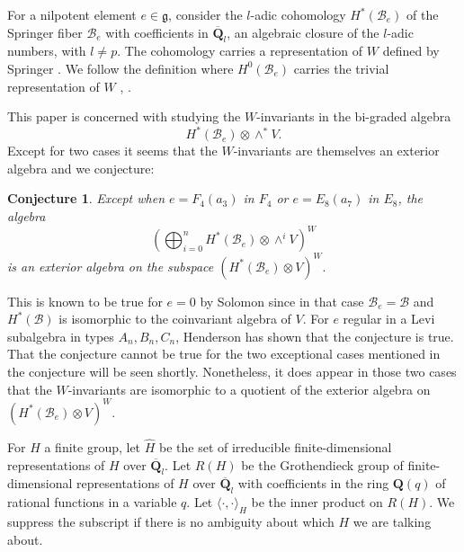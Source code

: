 \documentclass[10pt]{amsart}
\newcommand{\g}{\mathfrak{g}}
\newcommand{\zz}{\mathbf Z}
\newcommand{\qq}{\mathbf Q}
\newcommand{\flag}{{\mathcal B}}
\theoremstyle{plain}
\newtheorem{conjecture}[theorem]{Conjecture}
\theoremstyle{definition}
\theoremstyle{remark}
\begin{document}
For a nilpotent element $e \in \g$, consider the $l$-adic cohomology $H^*(\flag_e)$ of the Springer fiber $\flag_e$ with coefficients in $\overline{\qq}_l$, 
an algebraic closure of the $l$-adic numbers, with $l \neq p$.
The cohomology carries a representation of $W$ defined by Springer \cite{springer:green}.  We follow the definition where $H^0(\flag_e)$ carries
the trivial representation of $W$ \cite{hotta:springer}, \cite{lusztig:green}.

This paper is concerned with studying the $W$-invariants in the bi-graded algebra  $$H^*(\flag_e) \otimes \wedge^* V.$$
Except for two cases it seems that the $W$-invariants are themselves an exterior algebra and we conjecture:
\begin{conjecture}
\label{conj1}
Except when $e = F_4(a_3)$ in $F_4$ or $e = E_8(a_7)$ in $E_8$, 
the algebra $$\displaystyle ( \bigoplus_{i=0}^n H^*(\flag_e) \otimes \wedge^i V)^W$$ is an exterior algebra on the 
subspace $(H^*(\flag_e) \otimes V)^W.$
\end{conjecture}

This is known to be true for $e=0$ by Solomon \cite{solomon} since in that case $\flag_e = \flag$ and $H^*(\flag)$ is isomorphic to the coinvariant algebra of $V$.
For $e$ regular in a Levi subalgebra in types $A_n,B_n,C_n$, Henderson \cite{henderson:exterior} has shown that the conjecture is true.   That the conjecture cannot be
true for the two exceptional cases mentioned in the conjecture will be seen shortly.  
Nonetheless, it does appear in those two cases
that the $W$-invariants are isomorphic to a quotient of the exterior algebra on  $(H^*(\flag_e) \otimes V)^W$.


For $H$ a finite group, let $\hat{H}$ be the set of irreducible finite-dimensional 
representations of $H$ over $\overline{\qq}_l$. 
Let $R(H)$ be the Grothendieck group of finite-dimensional representations of $H$ over $\overline{\qq}_l$ with 
coefficients in the ring $\qq(q)$ of rational functions in a variable $q$.  Let $\langle \cdot , \cdot \rangle_H$ be the inner product on $R(H)$.
We suppress the subscript if there is no ambiguity about which $H$ we are talking about.
\end{document}
